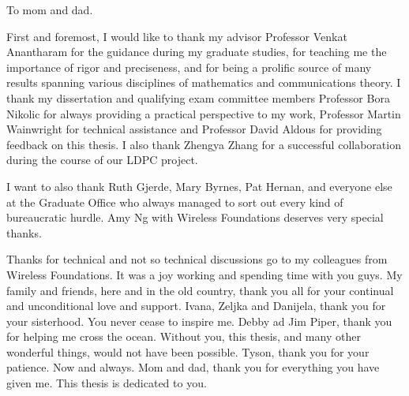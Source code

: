 \setcounter{page}{1}
\renewcommand{\thepage}{\roman{page}}

\begin{frontmatter}



\begin{dedication}
\null\vfil {\large
\begin{center}
To mom and dad.\\\vspace{12pt}
\end{center}}
\vfil\null
\end{dedication}



\begin{acknowledgements}

First and foremost, I would like to thank my advisor Professor
Venkat Anantharam for the guidance during my graduate studies, for
teaching me the importance of rigor and preciseness, and for being
a prolific source of many results spanning various disciplines of
mathematics and communications theory. I thank my dissertation and
qualifying exam committee members Professor Bora Nikolic for
always providing a practical perspective to my work, Professor
Martin Wainwright for technical assistance and Professor David
Aldous for providing feedback on this thesis. I also thank Zhengya
Zhang for a successful collaboration during the course of our LDPC
project.

I want to also thank Ruth Gjerde, Mary Byrnes, Pat Hernan, and
everyone else at the Graduate Office who always managed to sort out
every kind of bureaucratic hurdle. Amy Ng with Wireless Foundations
 deserves very special thanks.

Thanks for technical and not so technical discussions go to my
colleagues from Wireless Foundations. It was a joy working and
spending time with you guys. My family and friends, here and in the
old country, thank you all for your continual and unconditional love
and support. Ivana, Zeljka and Danijela, thank you for your
sisterhood. You never cease to inspire me. Debby ad Jim Piper, thank
you for helping me cross the ocean. Without you, this thesis, and
many other wonderful things, would not have been possible. Tyson,
thank you for your patience. Now and always. Mom and dad, thank you
for everything you have given me. This thesis is dedicated to you.


\end{acknowledgements}

\pagebreak\pagebreak \tableofcontents \listoffigures \listoftables
\end{frontmatter}



